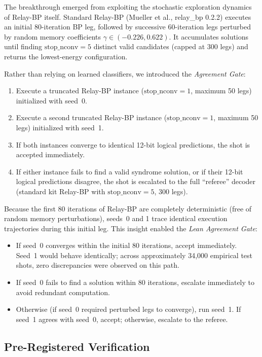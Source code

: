 The breakthrough emerged from exploiting the stochastic exploration dynamics of Relay-BP itself. Standard Relay-BP (Mueller et al., relay\_bp 0.2.2) executes an initial 80-iteration BP leg, followed by successive 60-iteration legs perturbed by random memory coefficients $\gamma \in (-0.226, 0.622)$. It accumulates solutions until finding $\text{stop\_nconv} = 5$ distinct valid candidates (capped at 300 legs) and returns the lowest-energy configuration.

Rather than relying on learned classifiers, we introduced the \textit{Agreement Gate}:
\begin{enumerate}
    \item Execute a truncated Relay-BP instance ($\text{stop\_nconv} = 1$, maximum 50 legs) initialized with seed~0.
    \item Execute a second truncated Relay-BP instance ($\text{stop\_nconv} = 1$, maximum 50 legs) initialized with seed~1.
    \item If both instances converge to identical 12-bit logical predictions, the shot is accepted immediately.
    \item If either instance fails to find a valid syndrome solution, or if their 12-bit logical predictions disagree, the shot is escalated to the full ``referee'' decoder (standard kit Relay-BP with $\text{stop\_nconv} = 5$, 300 legs).
\end{enumerate}

Because the first 80 iterations of Relay-BP are completely deterministic (free of random memory perturbations), seeds~0 and 1 trace identical execution trajectories during this initial leg. This insight enabled the \textit{Lean Agreement Gate}:
\begin{itemize}
    \item If seed~0 converges within the initial 80 iterations, accept immediately. Seed~1 would behave identically; across approximately 34,000 empirical test shots, zero discrepancies were observed on this path.
    \item If seed~0 fails to find a solution within 80 iterations, escalate immediately to avoid redundant computation.
    \item Otherwise (if seed~0 required perturbed legs to converge), run seed~1. If seed~1 agrees with seed~0, accept; otherwise, escalate to the referee.
\end{itemize}

\subsection{Pre-Registered Verification}

